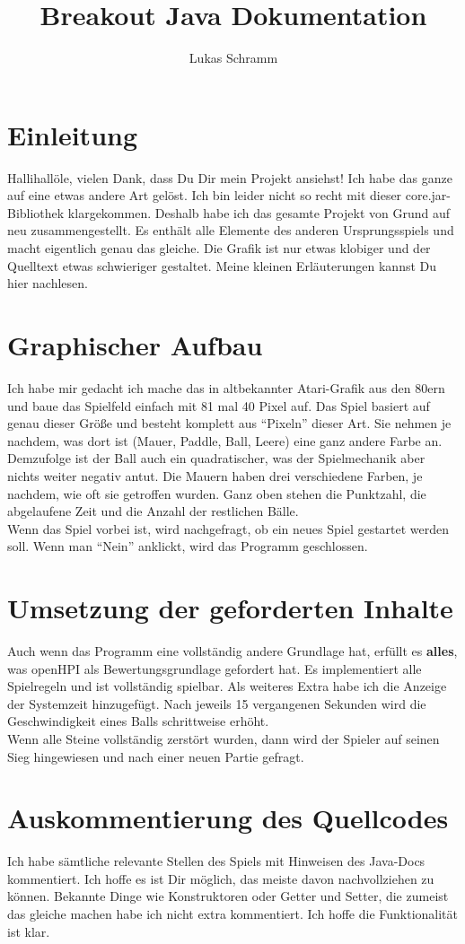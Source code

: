 \documentclass[12pt,a4paper,ngerman]{scrartcl}
\title{Breakout Java Dokumentation}
\author{Lukas Schramm}
\begin{document}
\section{Einleitung}
Hallihallöle,
vielen Dank, dass Du Dir mein Projekt ansiehst! Ich habe das ganze auf eine etwas andere Art gelöst. Ich bin leider nicht so recht mit dieser core.jar-Bibliothek klargekommen. Deshalb habe ich das gesamte Projekt von Grund auf neu zusammengestellt. Es enthält alle Elemente des anderen Ursprungsspiels und macht eigentlich genau das gleiche. Die Grafik ist nur etwas klobiger und der Quelltext etwas schwieriger gestaltet. Meine kleinen Erläuterungen kannst Du hier nachlesen.

\section{Graphischer Aufbau}
Ich habe mir gedacht ich mache das in altbekannter Atari-Grafik aus den 80ern und baue das Spielfeld einfach mit 81 mal 40 Pixel auf. Das Spiel basiert auf genau dieser Größe und besteht komplett aus \enquote{Pixeln} dieser Art. Sie nehmen je nachdem, was dort ist (Mauer, Paddle, Ball, Leere) eine ganz andere Farbe an. Demzufolge ist der Ball auch ein quadratischer, was der Spielmechanik aber nichts weiter negativ antut. Die Mauern haben drei verschiedene Farben, je nachdem, wie oft sie getroffen wurden. Ganz oben stehen die Punktzahl, die abgelaufene Zeit und die Anzahl der restlichen Bälle.\\
Wenn das Spiel vorbei ist, wird nachgefragt, ob ein neues Spiel gestartet werden soll. Wenn man \enquote{Nein} anklickt, wird das Programm geschlossen.

\section{Umsetzung der geforderten Inhalte}
Auch wenn das Programm eine vollständig andere Grundlage hat, erfüllt es \textbf{alles}, was openHPI als Bewertungsgrundlage gefordert hat. Es implementiert alle Spielregeln und ist vollständig spielbar. Als weiteres Extra habe ich die Anzeige der Systemzeit hinzugefügt. Nach jeweils 15 vergangenen Sekunden wird die Geschwindigkeit eines Balls schrittweise erhöht.\\
Wenn alle Steine vollständig zerstört wurden, dann wird der Spieler auf seinen Sieg hingewiesen und nach einer neuen Partie gefragt.

\section{Auskommentierung des Quellcodes}
Ich habe sämtliche relevante Stellen des Spiels mit Hinweisen des Java-Docs kommentiert. Ich hoffe es ist Dir möglich, das meiste davon nachvollziehen zu können. Bekannte Dinge wie Konstruktoren oder Getter und Setter, die zumeist das gleiche machen habe ich nicht extra kommentiert. Ich hoffe die Funktionalität ist klar.
\end{document}
